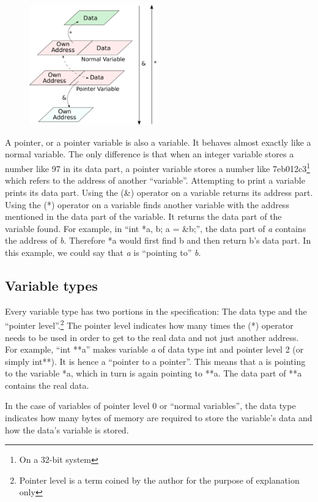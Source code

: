 \documentclass[10pt,twoside]{article}
\begin{document}
\begin{figure}
\includegraphics[width=55mm]{res/variable-pointer.pdf}
\end{figure}

A pointer, or a pointer variable is also a variable. It behaves almost exactly
like a normal variable. The only difference is that when an integer variable
stores a number like 97 in its data part, a pointer variable stores a number
like 7eb012c3\footnote{On a 32-bit system} which refers to the address of
another ``variable''. Attempting to print a variable prints its data part. Using
the (\&) operator on a variable returns its address part. Using the (*) operator
on a variable finds another variable with the address mentioned in the data part
of the variable.  It returns the data part of the variable found. For example,
in ``int *a, b; a = \&b;'', the data part of \textit{a} contains the address of
\textit{b}. Therefore *a would first find b and then return b's data part. In
this example, we could say that \textit{a} is ``pointing to'' \textit{b}.
\subsection*{Variable types} Every variable type has two portions in the
specification: The data type and the ``pointer level''.\footnote{Pointer level
is a term coined by the author for the purpose of explanation only} The pointer
level indicates how many times the (*) operator needs to be used in order to get
to the real data and not just another address. For example, ``int **a'' makes
variable \textit{a} of data type int and pointer level 2 (or simply int**). It
is hence a ``pointer to a pointer''. This means that a is pointing to the
variable *a, which in turn is again pointing to **a. The data part of **a
contains the real data.

In the case of variables of pointer level 0 or ``normal variables'', the data
type indicates how many bytes of memory are required to store the variable's
data and how the data's variable is stored.
\end{document}
